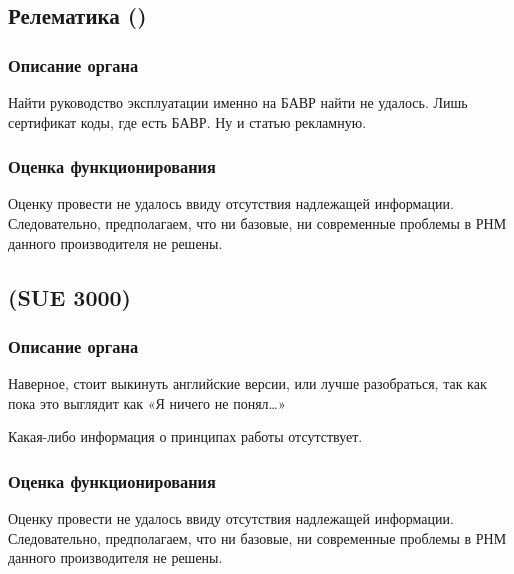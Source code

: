 \subsection{Релематика ()}

\subsubsection{Описание органа}

Найти руководство эксплуатации именно на БАВР найти не удалось. Лишь сертификат коды,
где есть БАВР. Ну и статью рекламную.

\subsubsection{Оценка функционирования}

Оценку провести не удалось ввиду отсутствия надлежащей информации. Следовательно,
предполагаем, что ни базовые, ни современные проблемы в РНМ данного производителя не
решены.

\subsection{ (SUE 3000)}

\subsubsection{Описание органа}

Наверное, стоит выкинуть английские версии, или лучше разобраться, так как пока это
выглядит как «Я ничего не понял…»

Какая-либо информация о принципах работы отсутствует.

\subsubsection{Оценка функционирования}

Оценку провести не удалось ввиду отсутствия надлежащей информации. Следовательно,
предполагаем, что ни базовые, ни современные проблемы в РНМ данного производителя не
решены.

